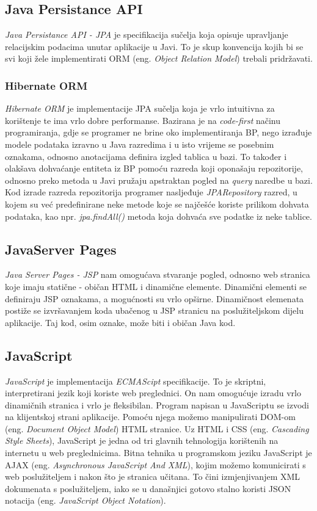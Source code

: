 \documentclass[zavrsni, numeric]{fer}
\begin{document}
\subsection{Java Persistance API}
\textit{Java Persistance API - JPA}\citep{jpa} je specifikacija sučelja koja opisuje upravljanje relacijskim podacima unutar aplikacije u Javi. To je skup konvencija kojih bi se svi koji žele implementirati ORM (eng. \textit{Object Relation Model}) trebali pridržavati.

\subsubsection{Hibernate ORM}
\textit{Hibernate ORM}\citep{hibernate} je implementacije JPA sučelja koja je vrlo intuitivna za korištenje te ima vrlo dobre performanse. Bazirana je na \textit{code-first} načinu programiranja, gdje se programer ne brine oko implementiranja BP, nego izrađuje modele podataka izravno u Java razredima i u isto vrijeme se posebnim oznakama, odnosno anotacijama definira izgled tablica u bazi. To također i olakšava dohvaćanje entiteta iz BP pomoću razreda koji oponašaju repozitorije, odnosno preko metoda u Javi pružaju apstraktan pogled na \textit{query} naredbe u bazi. Kod izrade razreda repozitorija programer nasljeđuje \textit{JPARepository} razred, u kojem su već predefinirane neke metode koje se najčešće koriste prilikom dohvata podataka, kao npr. \textit{jpa.findAll()} metoda koja dohvaća sve podatke iz neke tablice.

\subsection{JavaServer Pages}
\textit{Java Server Pages - JSP}\citep{jsp} nam omogućava stvaranje pogled, odnosno web stranica koje imaju statične - običan HTML i dinamične elemente. Dinamični elementi se definiraju JSP oznakama, a mogućnosti su vrlo opširne. Dinamičnost elemenata postiže se izvršavanjem koda ubačenog u JSP stranicu na poslužiteljskom dijelu aplikacije. Taj kod, osim oznake, može biti i običan Java kod.

\subsection{JavaScript}
\textit{JavaScript} je implementacija \textit{ECMAScipt}\citep{ecma-script} specifikacije. To je skriptni, interpretirani jezik koji koriste web preglednici. On nam omogućuje izradu vrlo dinamičnih stranica i vrlo je fleksibilan. Program napisan u JavaScriptu se izvodi na klijentskoj strani aplikacije. Pomoću njega možemo manipulirati DOM-om (eng. \textit{Document Object Model}) HTML stranice. Uz HTML i CSS (eng. \textit{Cascading Style Sheets}), JavaScript je jedna od tri glavnih tehnologija korištenih na internetu u web preglednicima. Bitna tehnika u programskom jeziku JavaScript je AJAX (eng. \textit{Asynchronous JavaScript And XML}), kojim možemo komunicirati s web poslužiteljem i nakon što je stranica učitana. To čini izmjenjivanjem XML dokumenata s poslužiteljem, iako se u današnjici gotovo stalno koristi JSON notacija (eng. \textit{JavaScript Object Notation}). 
\end{document}
